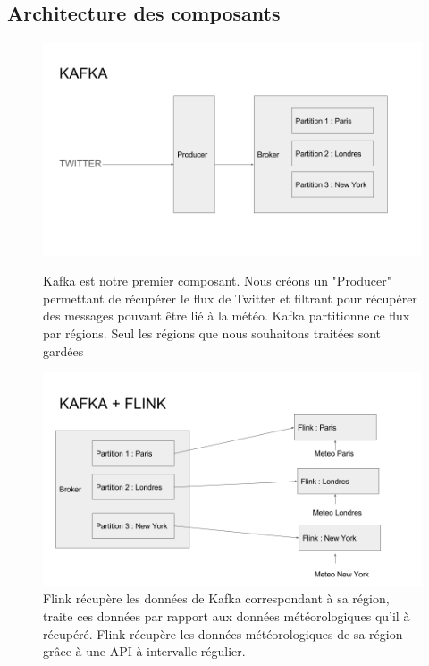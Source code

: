 \documentclass[a4paper,oneside,10pt]{article}
\begin{document}
\subsection{Architecture des composants}

\begin{figure}[h]
\centering
\includegraphics[width=15cm]{content/Kafka.png}
\caption{Kafka est notre premier composant. Nous créons un "Producer" permettant de récupérer le flux de Twitter et filtrant pour récupérer des messages pouvant être lié à la météo. Kafka partitionne ce flux par régions. Seul les régions que nous souhaitons traitées sont gardées}
\label{fig1}
\centering
\includegraphics[width=15cm]{content/KafkaFlink.png}
\caption{Flink récupère les données de Kafka correspondant à sa région, traite ces données par rapport aux données météorologiques qu'il à récupéré. Flink récupère les données météorologiques de sa région grâce à une API à intervalle régulier. }
\label{fig1}
\end{figure}
\end{document}
